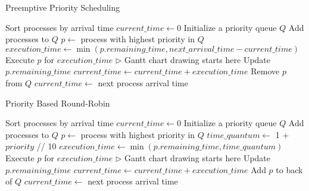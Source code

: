 \documentclass{article}
\begin{document}
\begin{algorithm}
\caption{Preemptive Priority Scheduling}
\begin{algorithmic}[1]
\State Sort processes by arrival time
\State $current\_time \gets 0$
\State Initialize a priority queue $Q$
        \State Add processes to $Q$
    \EndWhile
        \State $p \gets$ process with highest priority in $Q$
        \State $execution\_time \gets \min(p.remaining\_time, next\_arrival\_time - current\_time)$
        \State Execute $p$ for $execution\_time$ $\triangleright$ Gantt chart drawing starts here
        \State Update $p.remaining\_time$
        \State $current\_time \gets current\_time + execution\_time$
            \State Remove $p$ from $Q$
        \EndIf
    \Else
        \State $current\_time \gets$ next process arrival time
    \EndIf
\EndWhile
\end{algorithmic}
\end{algorithm}

\begin{algorithm}
\caption{Priority Based Round-Robin}
\begin{algorithmic}[1]
\State Sort processes by arrival time
\State $current\_time \gets 0$
\State Initialize a priority queue $Q$
        \State Add processes to $Q$
    \EndWhile
        \State $p \gets$ process with highest priority in $Q$
        \State $time\_quantum \gets$ 1 + $priority$ // 10
        \State $execution\_time \gets \min(p.remaining\_time, time\_quantum)$
        \State Execute $p$ for $execution\_time$ $\triangleright$ Gantt chart drawing starts here
        \State Update $p.remaining\_time$
        \State $current\_time \gets current\_time + execution\_time$
            \State Add $p$ to back of $Q$
        \EndIf
    \Else
        \State $current\_time \gets$ next process arrival time
    \EndIf
\EndWhile
\end{algorithmic}
\end{algorithm}
\end{document}
